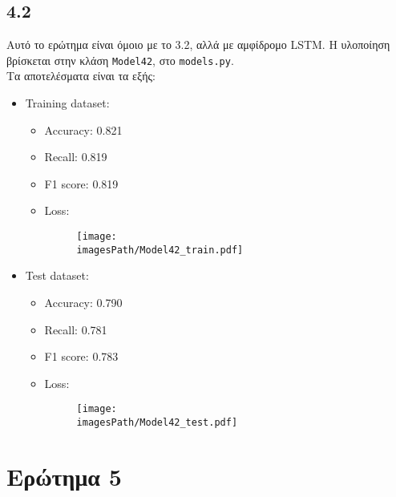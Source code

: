 \documentclass[a4paper, 12pt]{article}
\newcommand{\imagesPath}{results}
\newcommand{\myWidth}{0.8\linewidth}
\begin{document}
    \subsection*{4.2}

        Αυτό το ερώτημα είναι όμοιο με το 3.2, αλλά με αμφίδρομο LSTM. Η υλοποίηση βρίσκεται στην κλάση \verb|Model42|, στο \verb|models.py|. \\
        
        Τα αποτελέσματα είναι τα εξής:
        
        \begin{itemize}
            \item Training dataset:
                \begin{itemize}
                    \item Accuracy: 0.821 
                    \item Recall: 0.819 
                    \item F1 score: 0.819 
                    \item Loss:
                        \begin{figure}[H]
                            \centering
                            \texttt{[image: \\imagesPath/Model42\_train.pdf]}
                        \end{figure}
                \end{itemize}
                
            \item Test dataset:
                \begin{itemize}
                    \item Accuracy: 0.790 
                    \item Recall: 0.781 
                    \item F1 score: 0.783
                    \item Loss:
                        \begin{figure}[H]
                            \centering
                            \texttt{[image: \\imagesPath/Model42\_test.pdf]}
                        \end{figure}
                \end{itemize}
        \end{itemize}

\section*{Ερώτημα 5}
\end{document}
